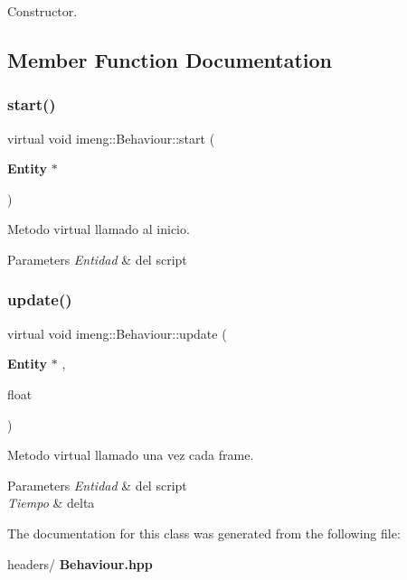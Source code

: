 Constructor. 



\subsection{Member Function Documentation}
\mbox{\label{classimeng_1_1_behaviour_a9830f6374d996e5209644e2ff38528ce}} 
\subsubsection{start()}
{\footnotesize\ttfamily virtual void imeng\+::\+Behaviour\+::start (\begin{DoxyParamCaption}\item[{\textbf{ Entity} $\ast$}]{ }\end{DoxyParamCaption})\hspace{0.3cm}{\ttfamily [pure virtual]}}



Metodo virtual llamado al inicio. 


\begin{DoxyParams}{Parameters}
{\em Entidad} & del script \\
\hline
\end{DoxyParams}
\mbox{\label{classimeng_1_1_behaviour_ab6c7c8f5b11d5a41a28fd28f36d75a1a}} 
\subsubsection{update()}
{\footnotesize\ttfamily virtual void imeng\+::\+Behaviour\+::update (\begin{DoxyParamCaption}\item[{\textbf{ Entity} $\ast$}]{,  }\item[{float}]{ }\end{DoxyParamCaption})\hspace{0.3cm}{\ttfamily [pure virtual]}}



Metodo virtual llamado una vez cada frame. 


\begin{DoxyParams}{Parameters}
{\em Entidad} & del script \\
\hline
{\em Tiempo} & delta \\
\hline
\end{DoxyParams}


The documentation for this class was generated from the following file\+:\begin{DoxyCompactItemize}
\item 
headers/\textbf{ Behaviour.\+hpp}\end{DoxyCompactItemize}
